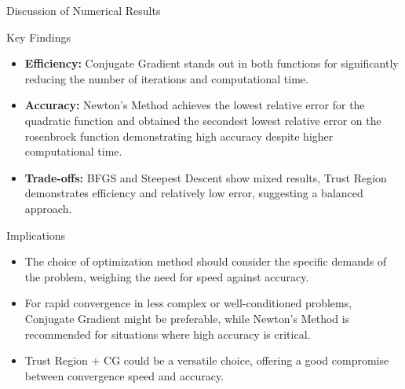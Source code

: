 \documentclass{beamer}
\begin{document}
\begin{frame}{Discussion of Numerical Results}
  \footnotesize

  \begin{block}{Key Findings}
    \begin{itemize}
      \item \textbf{Efficiency:} Conjugate Gradient stands out in both functions for significantly reducing the number of iterations and computational time.
      \item \textbf{Accuracy:} Newton's Method achieves the lowest relative error for the quadratic function and obtained the secondest lowest relative error on the rosenbrock function demonstrating high accuracy despite higher computational time.
      \item \textbf{Trade-offs:} BFGS and Steepest Descent show mixed results, Trust Region demonstrates efficiency and relatively low error, suggesting a balanced approach.

    \end{itemize}
  \end{block}

  \begin{block}{Implications}
    \begin{itemize}
      \item The choice of optimization method should consider the specific demands of the problem, weighing the need for speed against accuracy.
      \item For rapid convergence in less complex or well-conditioned problems, Conjugate Gradient might be preferable, while Newton's Method is recommended for situations where high accuracy is critical.
      \item Trust Region + CG could be a versatile choice, offering a good compromise between convergence speed and accuracy.
    \end{itemize}
  \end{block}

  \normalsize
\end{frame}
\end{document}
